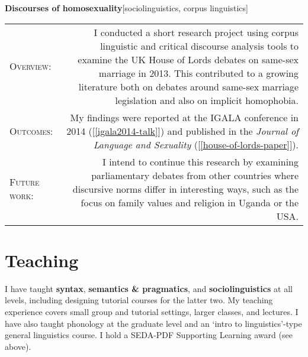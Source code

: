 \documentclass[11pt,a4paper,twoside]{article}
\makeatletter
\newlength{\rulelength}%
\newcommand{\REx}[2]{%
\vspace*{0.1\baselineskip}%
{\large\textbf{#1}\hfill\textnormal{[#2]}}%
\vspace*{0.5\baselineskip}%
}
\newenvironment{cvsection}{%
  \setlength{\extrarowheight}{0.70ex}
  \begin{longtable}[l]{@{} L R @{}}
}{%
  \end{longtable}
}
\newcommand{\sref}[1]{[\ref{#1}]}
\newcommand{\subhead}[1]{%
\textsc{#1}:%
}
\makeatother
\begin{document}
\REx{Discourses of homosexuality}{sociolinguistics, corpus linguistics}
\begin{cvsection}
  \subhead{Overview} &%
  I conducted a short research project using corpus linguistic and critical discourse analysis tools to examine the UK House of Lords debates on same-sex marriage in 2013. This contributed to a growing literature both on debates around same-sex marriage legislation and also on implicit homophobia.%
\\
  \subhead{Outcomes} &%
  My findings were reported at the IGALA conference in 2014 (\sref{igala2014-talk}) and published in the \textit{Journal of Language and Sexuality} (\sref{house-of-lords-paper}).%
\\
  \subhead{Future work} &%
  I intend to continue this research by examining parliamentary debates from other countries where discursive norms differ in interesting ways, such as the focus on family values and religion in Uganda or the USA.
\end{cvsection}


\newpage

\section*{Teaching}

I have taught \textbf{syntax}, \textbf{semantics \& pragmatics}, and \textbf{sociolinguistics} at all levels, including designing tutorial courses for the latter two. My teaching experience covers small group and tutorial settings, larger classes, and lectures. I have also taught phonology at the graduate level and an `intro to linguistics'-type general linguistics course. I hold a SEDA-PDF Supporting Learning award (see above).
\end{document}
